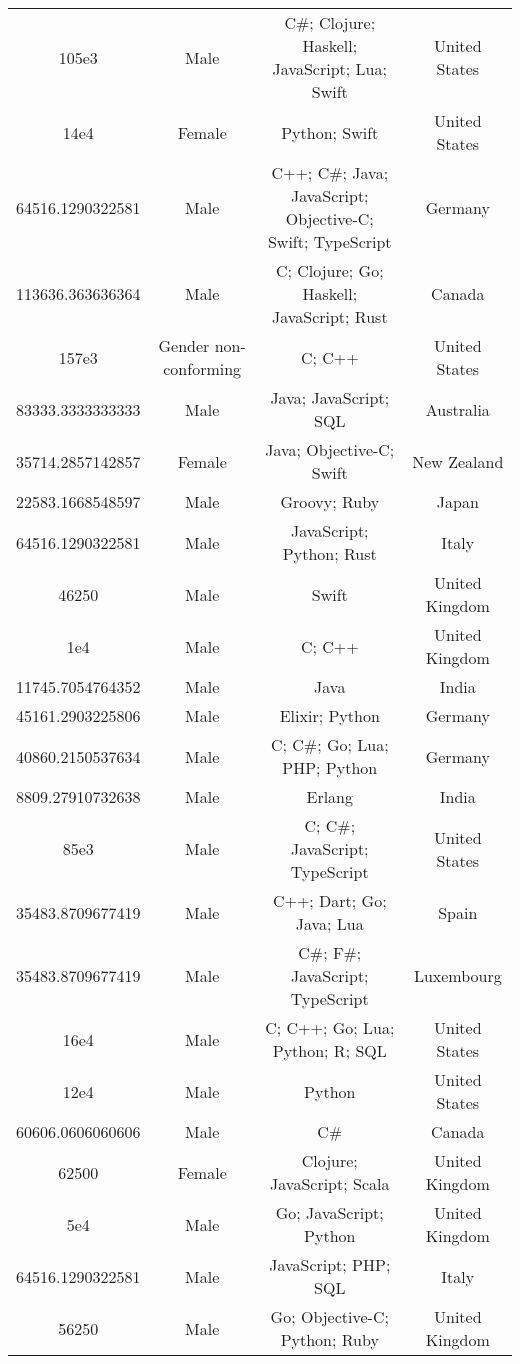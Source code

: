 \begin{center}
\begin{tabular}{ |c|c|c|c| }
105e3  &  Male  &  C\#; Clojure; Haskell; JavaScript; Lua; Swift  &  United States  \\ 
14e4  &  Female  &  Python; Swift  &  United States  \\ 
64516.1290322581  &  Male  &  C++; C\#; Java; JavaScript; Objective-C; Swift; TypeScript  &  Germany  \\ 
113636.363636364  &  Male  &  C; Clojure; Go; Haskell; JavaScript; Rust  &  Canada  \\ 
157e3  &  Gender non-conforming  &  C; C++  &  United States  \\ 
83333.3333333333  &  Male  &  Java; JavaScript; SQL  &  Australia  \\ 
35714.2857142857  &  Female  &  Java; Objective-C; Swift  &  New Zealand  \\ 
22583.1668548597  &  Male  &  Groovy; Ruby  &  Japan  \\ 
64516.1290322581  &  Male  &  JavaScript; Python; Rust  &  Italy  \\ 
46250  &  Male  &  Swift  &  United Kingdom  \\ 
1e4  &  Male  &  C; C++  &  United Kingdom  \\ 
11745.7054764352  &  Male  &  Java  &  India  \\ 
45161.2903225806  &  Male  &  Elixir; Python  &  Germany  \\ 
40860.2150537634  &  Male  &  C; C\#; Go; Lua; PHP; Python  &  Germany  \\ 
8809.27910732638  &  Male  &  Erlang  &  India  \\ 
85e3  &  Male  &  C; C\#; JavaScript; TypeScript  &  United States  \\ 
35483.8709677419  &  Male  &  C++; Dart; Go; Java; Lua  &  Spain  \\ 
35483.8709677419  &  Male  &  C\#; F\#; JavaScript; TypeScript  &  Luxembourg  \\ 
16e4  &  Male  &  C; C++; Go; Lua; Python; R; SQL  &  United States  \\ 
12e4  &  Male  &  Python  &  United States  \\ 
60606.0606060606  &  Male  &  C\#  &  Canada  \\ 
62500  &  Female  &  Clojure; JavaScript; Scala  &  United Kingdom  \\ 
5e4  &  Male  &  Go; JavaScript; Python  &  United Kingdom  \\ 
64516.1290322581  &  Male  &  JavaScript; PHP; SQL  &  Italy  \\ 
56250  &  Male  &  Go; Objective-C; Python; Ruby  &  United Kingdom  \\ 

\end{tabular}
\end{center}
